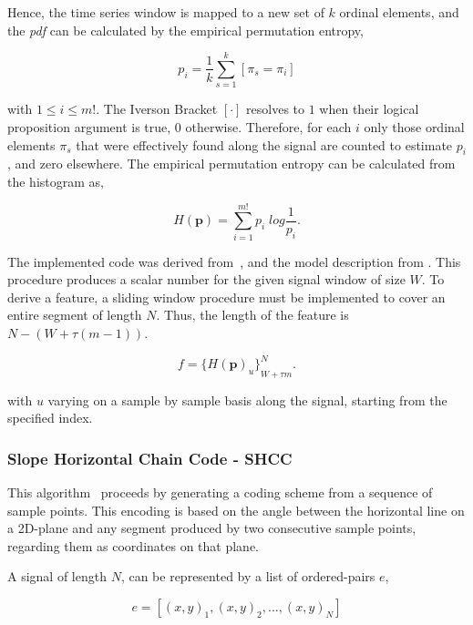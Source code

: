 Hence, the time series window is mapped to a new set of $k$ ordinal elements, and the \textit{pdf} can be calculated by the empirical permutation entropy,

\begin{equation}
p_i = \frac{1}{k} \sum_{s=1}^{k} \left[ \pi_{s} = \pi_{i} \right]
\label{eq:pe4}
\end{equation}

\noindent with $1 \leq i \leq m!$. The Iverson Bracket $ \left[ \cdot \right] $ resolves to $1$ when their logical proposition argument is true, $0$ otherwise. Therefore, for each $i$ only those ordinal elements $\pi_{s}$ that were effectively found along the signal are counted to estimate $p_i$, and zero elsewhere.  The empirical permutation entropy can be calculated from the histogram as,

\begin{equation}
H(\textbf{p}) = \sum_{i=1}^{m!} p_{i} \; log \frac{1}{p_{i}}.
\label{eq:pe5}
\end{equation}

The implemented code was derived from~\cite{Unakafova2013}, and the model description from \cite{Berger2017}.  This procedure produces a scalar number for the given signal window of size $W$.  To derive a feature, a sliding window procedure must be implemented to cover an entire segment of length $N$.  Thus, the length of the feature is $N - (W + \tau (m - 1))$.

\begin{equation}
f =  {\bigg \{ H(\textbf{p})_{u} \bigg \}}_{W + \tau  m}^{N}.
\label{eq:pe6}
\end{equation}

\noindent with $u$ varying on a sample by sample basis along the signal, starting from the specified index.

\subsubsection{Slope Horizontal Chain Code - SHCC}

This algorithm~\cite{Alvarado-Gonzalez2016} proceeds by generating a coding scheme from a sequence of sample points. This encoding is based on the angle between the horizontal line on a 2D-plane and any segment produced by two consecutive sample points, regarding them as coordinates on that plane.  

A signal of length $N$, can be represented by a list of ordered-pairs $e$,

\begin{equation}
e = \left[ (x,y)_{1}, (x,y)_{2}, ..., (x,y)_{N} \right]
\label{eq:shccdelta}
\end{equation}

